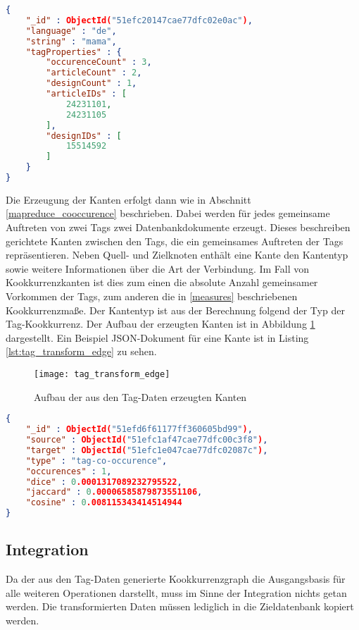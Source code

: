 \begin{lstlisting}[language=json, label={lst:tag_transform_node}, caption={Tag-Knoten als JSON-Dokument}]
{
    "_id" : ObjectId("51efc20147cae77dfc02e0ac"),
    "language" : "de",
    "string" : "mama",
    "tagProperties" : {
        "occurenceCount" : 3,
        "articleCount" : 2,
        "designCount" : 1,
        "articleIDs" : [
            24231101,
            24231105
        ],
        "designIDs" : [
            15514592
        ]
    }
}
\end{lstlisting}

Die Erzeugung der Kanten erfolgt dann wie in Abschnitt \ref{mapreduce_cooccurence} beschrieben. Dabei werden für jedes gemeinsame Auftreten von zwei Tags zwei Datenbankdokumente erzeugt. Dieses beschreiben gerichtete Kanten zwischen den Tags, die ein gemeinsames Auftreten der Tags repräsentieren. Neben Quell- und Zielknoten enthält eine Kante den Kantentyp sowie weitere Informationen über die Art der Verbindung. Im Fall von Kookkurrenzkanten ist dies zum einen die absolute Anzahl gemeinsamer Vorkommen der Tags, zum anderen die in \ref{measures} beschriebenen Kookkurrenzmaße. Der Kantentyp ist aus der Berechnung folgend der Typ der Tag-Kookkurrenz. Der Aufbau der erzeugten Kanten ist in Abbildung \ref{fig:tag_transform_edge} dargestellt. Ein Beispiel JSON-Dokument für eine Kante ist in Listing \ref{lst:tag_transform_edge} zu sehen.

\begin{figure}
\centering
\texttt{[image: tag\_transform\_edge]}
\caption{Aufbau der aus den Tag-Daten erzeugten Kanten}
\label{fig:tag_transform_edge}
\end{figure}

\begin{lstlisting}[language=json, label={lst:tag_transform_edge}, caption={Tag-Kante als JSON-Dokument}]
{
    "_id" : ObjectId("51efd6f61177ff360605bd99"),
    "source" : ObjectId("51efc1af47cae77dfc00c3f8"),
    "target" : ObjectId("51efc1e047cae77dfc02087c"),
    "type" : "tag-co-occurence",
    "occurences" : 1,
    "dice" : 0.0001317089232795522,
    "jaccard" : 0.00006585879873551106,
    "cosine" : 0.008115343414514944
}
\end{lstlisting}

\subsection{Integration}

Da der aus den Tag-Daten generierte Kookkurrenzgraph die Ausgangsbasis für alle weiteren Operationen darstellt, muss im Sinne der Integration nichts getan werden. Die transformierten Daten müssen lediglich in die Zieldatenbank kopiert werden.

